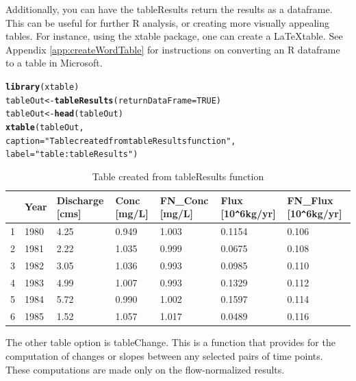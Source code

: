 \documentclass[a4paper,11pt]{article}\usepackage{graphicx, color}
\makeatletter
\newcommand{\hlfunctioncall}[1]{\textcolor[rgb]{0.501960784313725,0,0.329411764705882}{\textbf{#1}}}%
\newcommand{\hlstring}[1]{\textcolor[rgb]{0.6,0.6,1}{#1}}%
\newenvironment{kframe}{%
 \def\at@end@of@kframe{}%
 \ifinner\ifhmode%
  \def\at@end@of@kframe{\end{minipage}}%
  \begin{minipage}{\columnwidth}%
 \fi\fi%
 \def\FrameCommand##1{\hskip\@totalleftmargin \hskip-\fboxsep
 \colorbox{shadecolor}{##1}\hskip-\fboxsep
     \hskip-\linewidth \hskip-\@totalleftmargin \hskip\columnwidth}%
 \MakeFramed {\advance\hsize-\width
   \@totalleftmargin\z@ \linewidth\hsize
   \@setminipage}}%
 {\par\unskip\endMakeFramed%
 \at@end@of@kframe}
\newenvironment{knitrout}{}{} %
\makeatother
\begin{document}
\FloatBarrier

Additionally, you can have the tableResults return the results as a dataframe. This can be useful for further R analysis, or creating more visually appealing tables.  For instance, using the xtable package, one can create a \LaTeX table. See Appendix \ref{app:createWordTable} for instructions on converting an R dataframe to a table in Microsoft.

\begin{knitrout}
\color{fgcolor}\begin{kframe}
\begin{alltt}
\hlfunctioncall{library}(xtable)
tableOut <- \hlfunctioncall{tableResults}(returnDataFrame = TRUE)
tableOut <- \hlfunctioncall{head}(tableOut)
\hlfunctioncall{xtable}(tableOut, 
    caption=\hlstring{"Table created from tableResults function"},
    label=\hlstring{"table:tableResults"})
\end{alltt}
\end{kframe}
\end{knitrout}


\begin{table}[ht]
\centering
\begin{tabular}{rllllll}
  \hline
 & Year & Discharge [cms] & Conc [mg/L] & FN\_Conc [mg/L] & Flux [10\verb|^|6kg/yr] & FN\_Flux [10\verb|^|6kg/yr] \\ 
  \hline
1 &    1980 &      4.25 &     0.949 &     1.003 &    0.1154 &     0.106 \\ 
  2 &    1981 &      2.22 &     1.035 &     0.999 &    0.0675 &     0.108 \\ 
  3 &    1982 &      3.05 &     1.036 &     0.993 &    0.0985 &     0.110 \\ 
  4 &    1983 &      4.99 &     1.007 &     0.993 &    0.1329 &     0.112 \\ 
  5 &    1984 &      5.72 &     0.990 &     1.002 &    0.1597 &     0.114 \\ 
  6 &    1985 &      1.52 &     1.057 &     1.017 &    0.0489 &     0.116 \\ 
   \hline
\end{tabular}
\caption{Table created from tableResults function} 
\label{table:tableResults}
\end{table}

\FloatBarrier

The other table option is tableChange. This is a function that provides for the computation of changes or slopes between any selected pairs of time points.  These computations are made only on the flow-normalized results.
\end{document}
